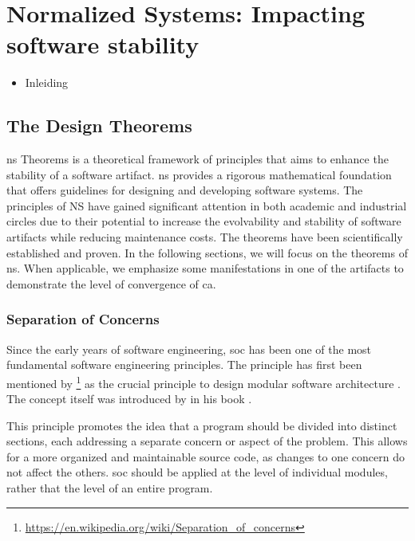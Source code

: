 \section{Normalized Systems: Impacting software stability} 
\label{ns_theory}
\begin{itemize}
    \item Inleiding
\end{itemize}


\subsection{The Design Theorems} \label{subsec:ns_desing_theorems}

\gls{ns} Theorems is a theoretical framework of principles that aims to enhance the
stability of a software artifact. \gls{ns} provides a rigorous mathematical foundation
that offers guidelines for designing and developing software systems. The principles of NS
have gained significant attention in both academic and industrial circles due to their
potential to increase the evolvability and stability of software artifacts while reducing
maintenance costs. The theorems have been scientifically established and proven. In the
following sections, we will focus on the theorems of \gls{ns}. When applicable, we
emphasize some manifestations in one of the artifacts to demonstrate the level of
convergence of \gls{ca}.

\subsubsection{Separation of Concerns}
Since the early years of software engineering, \gls{soc} has been one of the most
fundamental software engineering principles. The principle has first been mentioned by
\citeauthor{dijkstra_selected_1982}\footnote{\url{https://en.wikipedia.org/wiki/Separation_of_concerns}}
as the crucial principle to design modular software architecture
\parencite[]{dijkstra_selected_1982}. The concept itself was introduced by
\citeauthor{parnas_criteria_1972} in his book .

This principle promotes the idea that a program should be divided into distinct sections,
each addressing a separate concern or aspect of the problem. This allows for a more
organized and maintainable source code, as changes to one concern do not affect the
others. \gls{soc} should be applied at the level of individual modules, rather that the level
of an entire program.

